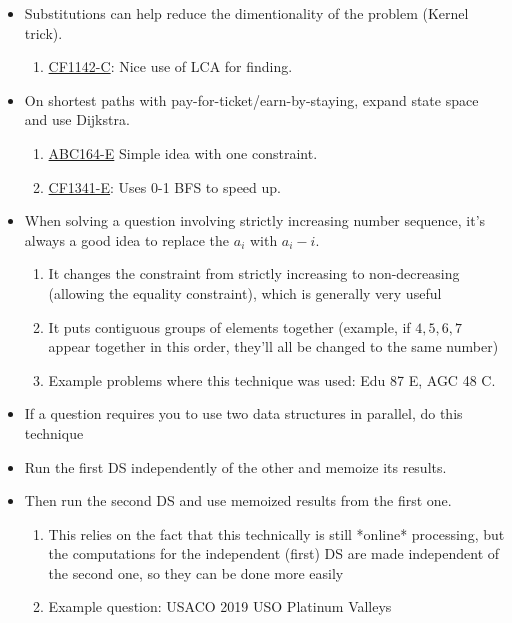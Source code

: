 \begin{itemize}
    \item Substitutions can help reduce the dimentionality of the problem (Kernel trick).
          \begin{enumerate}
              \item \href{https://codeforces.com/problemset/problem/1142/C}{CF1142-C}: Nice use of LCA for finding.
          \end{enumerate}
    \item On shortest paths with pay-for-ticket/earn-by-staying, expand state space and use Dijkstra.
          \begin{enumerate}
              \item \href{https://atcoder.jp/contests/abc164/tasks/abc164_e}{ABC164-E} Simple idea with one constraint.
              \item \href{https://codeforces.com/contest/1341/problem/E}{CF1341-E}: Uses 0-1 BFS to speed up.
          \end{enumerate}
\end{itemize}

\begin{itemize}
    \item When solving a question involving strictly increasing number sequence, it's always a good idea to replace the $a_i$ with $a_i - i$.
    \begin{enumerate}
        \item It changes the constraint from strictly increasing to non-decreasing (allowing the equality constraint), which is generally very useful
        \item It puts contiguous groups of elements together (example, if $4, 5, 6, 7$ appear together in this order, they'll all be changed to the same number)
        \item Example problems where this technique was used: Edu 87 E, AGC 48 C.
    \end{enumerate}
\end{itemize}

\begin{itemize}
    \item If a question requires you to use two data structures in parallel, do this technique
    \item Run the first DS independently of the other and memoize its results.
    \item Then run the second DS and use memoized results from the first one.
    \begin{enumerate}
        \item This relies on the fact that this technically is still *online* processing, but the computations for the independent (first) DS are made independent of the second one, so they can be done more easily
        \item Example question: USACO 2019 USO Platinum Valleys 
    \end{enumerate}
\end{itemize}

